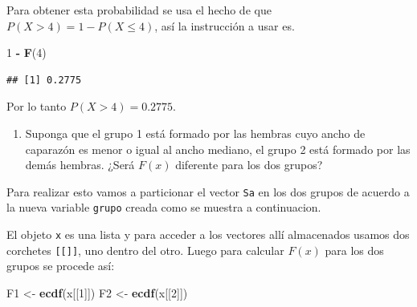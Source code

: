 \documentclass[10pt,]{krantz}
\makeatletter
\newenvironment{Shaded}{\begin{snugshade}}{\end{snugshade}}
\newcommand{\KeywordTok}[1]{\textcolor[rgb]{0.13,0.29,0.53}{\textbf{#1}}}
\newcommand{\DataTypeTok}[1]{\textcolor[rgb]{0.13,0.29,0.53}{#1}}
\newcommand{\DecValTok}[1]{\textcolor[rgb]{0.00,0.00,0.81}{#1}}
\newcommand{\StringTok}[1]{\textcolor[rgb]{0.31,0.60,0.02}{#1}}
\newcommand{\OperatorTok}[1]{\textcolor[rgb]{0.81,0.36,0.00}{\textbf{#1}}}
\newcommand{\NormalTok}[1]{#1}
\providecommand{\tightlist}{%
  \setlength{\itemsep}{0pt}\setlength{\parskip}{0pt}}
\newenvironment{kframe}{%
\medskip{}
\setlength{\fboxsep}{.8em}
 \def\at@end@of@kframe{}%
 \ifinner\ifhmode%
  \def\at@end@of@kframe{\end{minipage}}%
  \begin{minipage}{\columnwidth}%
 \fi\fi%
 \def\FrameCommand##1{\hskip\@totalleftmargin \hskip-\fboxsep
 \colorbox{shadecolor}{##1}\hskip-\fboxsep
     \hskip-\linewidth \hskip-\@totalleftmargin \hskip\columnwidth}%
 \MakeFramed {\advance\hsize-\width
   \@totalleftmargin\z@ \linewidth\hsize
   \@setminipage}}%
 {\par\unskip\endMakeFramed%
 \at@end@of@kframe}
\renewenvironment{Shaded}{\begin{kframe}}{\end{kframe}}
\makeatother
\begin{document}
Para obtener esta probabilidad se usa el hecho de que
\(P(X > 4) = 1 - P(X \leq 4)\), así la instrucción a usar es.

\begin{Shaded}
\begin{Highlighting}[]
\DecValTok{1} \OperatorTok{-}\StringTok{ }\KeywordTok{F}\NormalTok{(}\DecValTok{4}\NormalTok{)}
\end{Highlighting}
\end{Shaded}

\begin{verbatim}
## [1] 0.2775
\end{verbatim}

Por lo tanto \(P(X > 4)=0.2775\).

\begin{enumerate}
\def\labelenumi{\arabic{enumi})}
\setcounter{enumi}{4}
\tightlist
\item
  Suponga que el grupo 1 está formado por las hembras cuyo ancho de
  caparazón es menor o igual al ancho mediano, el grupo 2 está formado
  por las demás hembras. ¿Será \(F(x)\) diferente para los dos grupos?
\end{enumerate}

Para realizar esto vamos a particionar el vector \texttt{Sa} en los dos
grupos de acuerdo a la nueva variable \texttt{grupo} creada como se
muestra a continuacion.

\begin{Shaded}
\end{Shaded}

El objeto \texttt{x} es una lista y para acceder a los vectores allí
almacenados usamos dos corchetes \texttt{{[}{[}{]}{]}}, uno dentro del
otro. Luego para calcular \(F(x)\) para los dos grupos se procede así:

\begin{Shaded}
\begin{Highlighting}[]
\NormalTok{F1 <-}\StringTok{ }\KeywordTok{ecdf}\NormalTok{(x[[}\DecValTok{1}\NormalTok{]])}
\NormalTok{F2 <-}\StringTok{ }\KeywordTok{ecdf}\NormalTok{(x[[}\DecValTok{2}\NormalTok{]])}
\end{Highlighting}
\end{Shaded}
\end{document}
